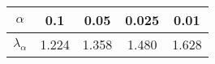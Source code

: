 \begin{tabular}{|c|c|c|c|c|}
 \hline 
$\alpha$ & 0.1 & 0.05 & 0.025 & 0.01 \\
 \hline 
$\lambda_{\alpha}$ & 1.224 & 1.358 & 1.480 & 1.628 \\
 \hline 
\end{tabular}
